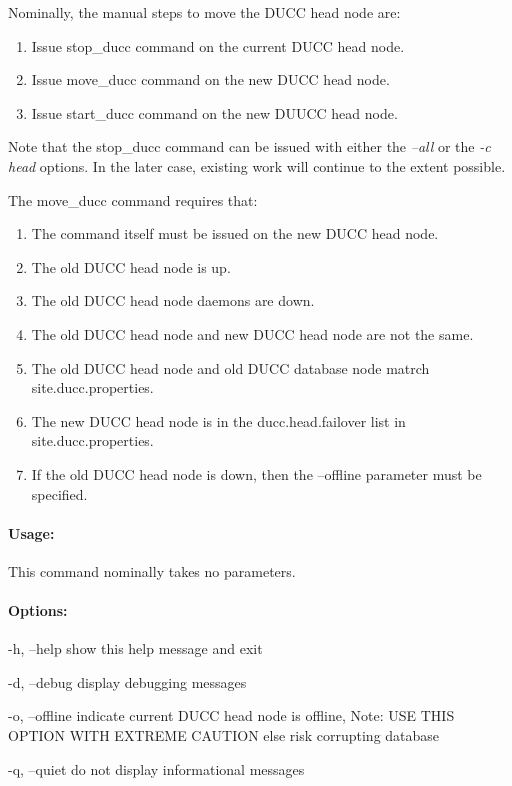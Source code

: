         Nominally, the manual steps to move the DUCC head node are:
        \begin{enumerate}
          \item Issue stop\_ducc command on the current DUCC head node.
          \item Issue move\_ducc command on the new DUCC head node.
          \item Issue start\_ducc command on the new DUUCC head node.
        \end{enumerate}

        Note that the stop\_ducc command can be issued with either the 
        {\em --all}
        or the 
        {\em -c head}
        options.
        In the later case, existing work will continue to the extent possible.
               
        The move\_ducc command requires that:
        \begin{enumerate}
          \item The command itself must be issued on the new DUCC head node.
          \item The old DUCC head node is up.
          \item The old DUCC head node daemons are down.
          \item The old DUCC head node and new DUCC head node are not the same.
          \item The old DUCC head node and old DUCC database node matrch site.ducc.properties.
          \item The new DUCC head node is in the ducc.head.failover list in site.ducc.properties.
          \item If the old DUCC head node is down, then the --offline parameter must be specified.
        \end{enumerate}
       
    \paragraph{Usage:}
        This command nominally takes no parameters.
        
    \paragraph{Options:}
    \begin{description}
      	\item -h, --help     show this help message and exit
      	\item -d, --debug    display debugging messages
      	\item -o, --offline  indicate current DUCC head node is offline, Note: USE THIS OPTION WITH EXTREME CAUTION else risk corrupting database
      	\item -q, --quiet    do not display informational messages
    \end{description}

